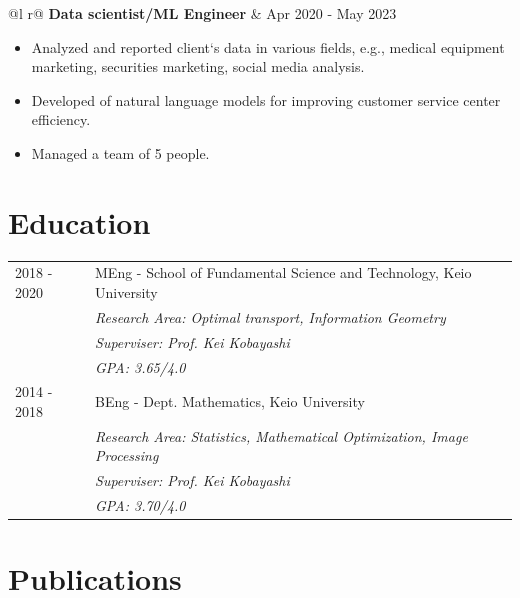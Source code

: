 \documentclass[a4paper,12pt]{article}
\begin{document}
\begin{tabularx}{\linewidth}{ @{}l r@{} }
\textbf{Data scientist/ML Engineer} & \hfill Apr 2020 - May 2023 \\[3.75pt]
\end{tabularx}
\begin{itemize}
    \item Analyzed and reported client‘s data in various fields, e.g., medical equipment marketing, securities marketing, social media analysis.
    \item Developed of natural language models for improving customer service center efficiency.
    \item Managed a team of 5 people.
\end{itemize}



\section{Education}
\begin{tabularx}{\linewidth}{@{}l X@{}}	
2018 - 2020 & MEng - School of Fundamental Science and Technology, Keio University \\
& \textit{Research Area: Optimal transport, Information Geometry} \\
&\textit{Superviser: Prof. Kei Kobayashi}\\
&\textit{GPA: 3.65/4.0} \\ 
2014 - 2018 & BEng - Dept. Mathematics, Keio University \\ 
& \textit{Research Area: Statistics, Mathematical Optimization, Image Processing} \\
&\textit{Superviser: Prof. Kei Kobayashi}\\
&\textit{GPA: 3.70/4.0} \\ 
\end{tabularx}

\section{Publications}
\begin{refsection}
\cite{tong2021entropy}
\printbibliography[heading=none]
\end{refsection}
\end{document}
